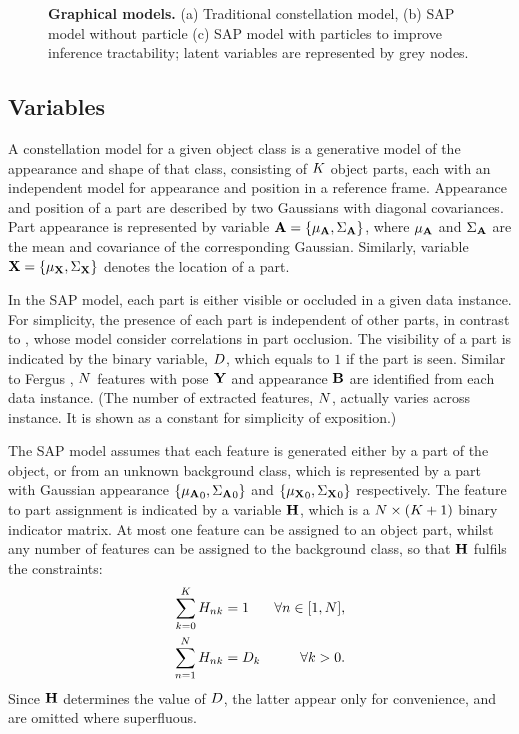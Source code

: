 \begin{figure}[ht]
\begin{subfigure}[t]{0.48\linewidth}
	\label{fig/reg/graphicalModelParticle}
\end{subfigure}
\caption{\textbf{Graphical models.} (a) Traditional constellation model, (b) SAP model without particle (c) SAP model with particles to improve inference tractability; latent variables are represented by grey nodes.}
\label{fig/reg/graphicalmodel}
\end{figure} 

\subsection{Variables}

A constellation model for a given object class is a generative model of the appearance and shape of that class, consisting of $K$ object parts, each with an independent model for appearance and position in a reference frame. Appearance and position of a part are described by two Gaussians with diagonal covariances. Part appearance is represented by variable $\mathbf{A}=\{{\mu_{\mathbf{A}}},{\Sigma_{\mathbf{A}}}\}$, where ${\mu_{\mathbf{A}}}$ and ${\Sigma_{\mathbf{A}}}$ are the mean and covariance of the corresponding Gaussian. Similarly, variable $\mathbf{X}=\{{\mu_{\mathbf{X}}},{\Sigma_{\mathbf{X}}}\}$ denotes the location of a part. 

In the SAP model, each part is either visible or occluded in a given data instance.   
For simplicity, the presence of each part is independent of other parts, in contrast to \cite{Fergus2007, Weber2000}, whose model consider correlations in part occlusion. 
The visibility of a part is indicated by the binary variable, ${D}$, which equals to $1$ if the part is seen. Similar to Fergus \etal \cite{Fergus2007}, $N$ features with pose $\mathbf{Y}$ and appearance $\mathbf{B}$ are identified from each data instance. (The number of extracted features, $N$, actually varies across instance. It is shown as a constant for simplicity of exposition.)  

The SAP model assumes that each feature is generated either by a part of the object, or from an unknown background class, which is represented by a part with Gaussian appearance $\{{\mu_{\mathbf{A}}}_0, {\Sigma_{\mathbf{A}}}_0\}$ and $\{{\mu_{\mathbf{X}}}_0, {\Sigma_{\mathbf{X}}}_0\}$ respectively. 
The feature to part assignment is indicated by a variable $\mathbf{H}$, which is a $N \times (K + 1)$ binary indicator matrix. 
At most one feature can be assigned to an object part, whilst any number of features can be assigned to the background class, so that $\mathbf{H}$ fulfils the constraints: 
\begin{equation}
	\begin{aligned}
		\sum_{k = 0}^{K}{H}_{nk}& =1 & \forall n \in [1, N], \\ 
		\sum_{n = 1}^{N}{H}_{nk}& ={D}_k & \forall k>0.
	\end{aligned} 
\end{equation}
Since $\mathbf{H}$ determines the value of ${D}$, the latter appear only for convenience, and are omitted where superfluous. 


